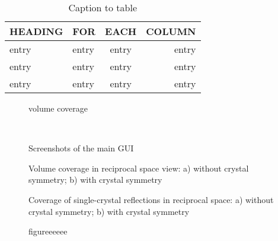 \documentclass{iucr}              %
\begin{document}



\begin{table}
\caption{Caption to table}
\begin{tabular}{llcr}      %
 HEADING    & FOR        & EACH       & COLUMN     \\
\hline
 entry      & entry      & entry      & entry      \\
 entry      & entry      & entry      & entry      \\
 entry      & entry      & entry      & entry      \\
\end{tabular}
\end{table}





\begin{figure}
\caption{volume coverage}
\label{fig:volume_coverage}
\end{figure}

\
\begin{figure}
\caption{Screenshots of the main GUI}
\label{fig:screenshots}
\end{figure}




\begin{figure}
\caption{Volume coverage in reciprocal space view: a) without crystal symmetry;
b) with crystal symmetry}
\label{fig:volume_view}
\end{figure}


\begin{figure}
\caption{Coverage of single-crystal reflections in reciprocal space: a) without
crystal symmetry; b) with crystal symmetry}
\label{fig:refl_view}
\end{figure}





\begin{figure}
\caption{figureeeeee}
\label{fig:screenshots}
\end{figure}
\end{document}
